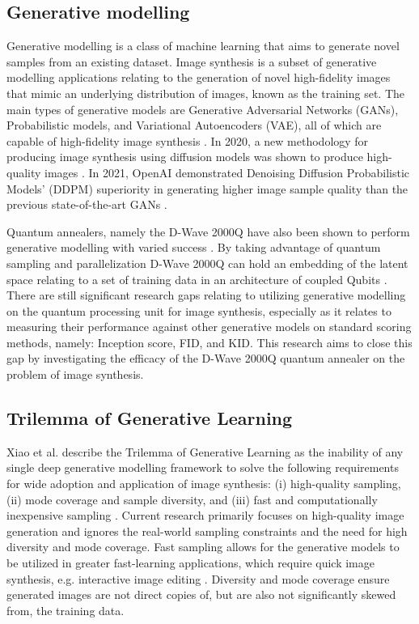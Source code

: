 \documentclass[%
 reprint,
 amsmath,amssymb,
 aps,
]{revtex4-2}
\begin{document}
\subsection{Generative modelling}
\noindent
Generative modelling is a class of machine learning that aims to generate novel samples from an existing dataset. Image synthesis is a subset of generative modelling applications relating to the generation of novel high-fidelity images that mimic an underlying distribution of images, known as the training set. The main types of generative models are Generative Adversarial Networks (GANs), Probabilistic models, and Variational Autoencoders (VAE), all of which are capable of high-fidelity image synthesis \cite{weng2021diffusion}. In 2020, a new methodology for producing image synthesis using diffusion models was shown to produce high-quality images \cite{ho2020denoising}. In 2021, OpenAI demonstrated Denoising Diffusion Probabilistic Models' (DDPM) superiority in generating higher image sample quality than the previous state-of-the-art GANs \cite{dhariwal2021diffusion}. 

Quantum annealers, namely the D-Wave 2000Q have also been shown to perform generative modelling with varied success \cite{Jain2020}\cite{Thulasidasan2016}. By taking advantage of quantum sampling and parallelization D-Wave 2000Q can hold an embedding of the latent space relating to a set of training data in an architecture of coupled Qubits \cite{Amin_2018}. There are still significant research gaps relating to utilizing generative modelling on the quantum processing unit for image synthesis, especially as it relates to measuring their performance against other generative models on standard scoring methods, namely: Inception score, FID, and KID. This research aims to close this gap by investigating the efficacy of the D-Wave 2000Q quantum annealer on the problem of image synthesis.

\subsection{Trilemma of Generative Learning}
\label{trilemmaGL}
Xiao et al. describe the Trilemma of Generative Learning as the inability of any single deep generative modelling framework to solve the following requirements for wide adoption and application of image synthesis: (i) high-quality sampling, (ii) mode coverage and sample diversity, and (iii) fast and computationally inexpensive sampling \cite{xiao2022DDGAN}. Current research primarily focuses on high-quality image generation and ignores the real-world sampling constraints and the need for high diversity and mode coverage. Fast sampling allows for the generative models to be utilized in greater fast-learning applications, which require quick image synthesis, e.g. interactive image editing \cite{xiao2022DDGAN}. Diversity and mode coverage ensure generated images are not direct copies of, but are also not significantly skewed from, the training data.
\end{document}
